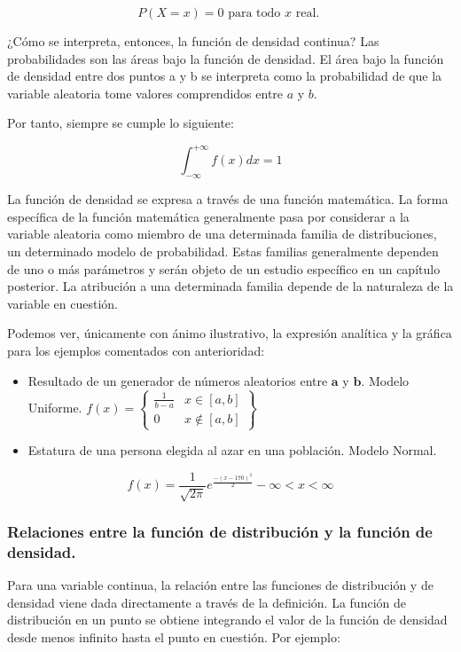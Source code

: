 \documentclass[
]{article}
\providecommand{\tightlist}{%
  \setlength{\itemsep}{0pt}\setlength{\parskip}{0pt}}
\begin{document}
\[
P(X=x)=0 \text { para todo } x \text { real. }
\]

¿Cómo se interpreta, entonces, la función de densidad continua? Las
probabilidades son las áreas bajo la función de densidad. El área bajo
la función de densidad entre dos puntos a y b se interpreta como la
probabilidad de que la variable aleatoria tome valores comprendidos
entre \(a\) y \(b\).

Por tanto, siempre se cumple lo siguiente:

\[
\int_{-\infty}^{+\infty} f(x) d x=1
\]

La función de densidad se expresa a través de una función matemática. La
forma específica de la función matemática generalmente pasa por
considerar a la variable aleatoria como miembro de una determinada
familia de distribuciones, un determinado modelo de probabilidad. Estas
familias generalmente dependen de uno o más parámetros y serán objeto de
un estudio específico en un capítulo posterior. La atribución a una
determinada familia depende de la naturaleza de la variable en cuestión.

Podemos ver, únicamente con ánimo ilustrativo, la expresión analítica y
la gráfica para los ejemplos comentados con anterioridad:

\begin{itemize}
\tightlist
\item
  Resultado de un generador de números aleatorios entre
  \(\boldsymbol{a}\) y \(\boldsymbol{b}\). Modelo Uniforme.
  \(f(x)=\left\{\begin{array}{cc}\frac{1}{b-a} & x \in[a, b] \\ 0 & x \notin[a, b]\end{array}\right\}\)
\item
  Estatura de una persona elegida al azar en una población. Modelo
  Normal.
\end{itemize}

\[
f(x)=\frac{1}{\sqrt{2 \pi}} e^{\frac{-(x-170)^{2}}{2}}-\infty<x<\infty
\]

\subsubsection{Relaciones entre la función de distribución y la función de densidad.}\label{relaciones-entre-la-funciuxf3n-de-distribuciuxf3n-y-la-funciuxf3n-de-densidad.}

Para una variable continua, la relación entre las funciones de
distribución y de densidad viene dada directamente a través de la
definición. La función de distribución en un punto se obtiene integrando
el valor de la función de densidad desde menos infinito hasta el punto
en cuestión. Por ejemplo:
\end{document}
